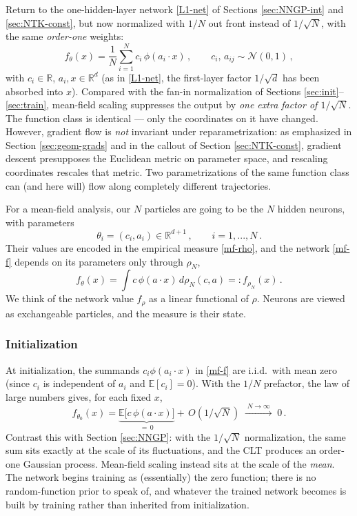 \documentclass[11pt]{article}
\newcommand{\R}{\mathbb{R}}
\newcommand{\E}{\mathbb{E}}
\newcommand{\CN}{{\mathcal N}}
\begin{document}
Return to the one-hidden-layer network \eqref{L1-net} of Sections \ref{sec:NNGP-int} and \ref{sec:NTK-const}, but now normalized with $1/N$ out front instead of $1/\sqrt N$, with the same \emph{order-one} weights:
%
\begin{equation} \label{mf-f}
    f_\theta(x) = \frac{1}{N} \sum_{i=1}^N c_i\,\phi(a_i\cdot x)\,,\qquad c_i,\, a_{ij} \sim \CN(0,1)\,,
\end{equation}
%
with $c_i\in\R$, $a_i,x\in\R^d$ (as in \eqref{L1-net}, the first-layer factor $1/\sqrt d$ has been absorbed into $x$). Compared with the fan-in normalization of Sections \ref{sec:init}--\ref{sec:train}, mean-field scaling suppresses the output by \emph{one extra factor of $1/\sqrt N$}. The function class is identical --- only the coordinates on it have changed. However, gradient flow is \emph{not} invariant under reparametrization: as emphasized in Section \ref{sec:geom-grads} and in the callout of Section \ref{sec:NTK-const}, gradient descent presupposes the Euclidean metric on parameter space, and rescaling coordinates rescales that metric. Two parametrizations of the same function class can (and here will) flow along completely different trajectories.

For a mean-field analysis, our $N$ particles are going to be the $N$ hidden neurons, with parameters
%
\begin{equation}
    \theta_i = (c_i,a_i) \in \R^{d+1}\,,\qquad i=1,...,N\,.
\end{equation}
%
Their values are encoded in the empirical measure \eqref{mf-rho}, and the network \eqref{mf-f} depends on its parameters only through $\rho_N$,
%
\begin{equation} \label{mf-frho}
    f_\theta(x) = \int c\,\phi(a\cdot x)\,d\rho_N(c,a) =: f_{\rho_N}(x)\,.
\end{equation}
%
We think of the network value $f_\rho$ as a linear functional of $\rho$. Neurons are viewed as exchangeable particles, and the measure is their state.

\subsubsection{Initialization}

At initialization, the summands $c_i\phi(a_i\cdot x)$ in \eqref{mf-f} are i.i.d.\ with mean zero (since $c_i$ is independent of $a_i$ and $\E[c_i]=0$). With the $1/N$ prefactor, the law of large numbers gives, for each fixed $x$,
%
\begin{equation}
    f_{\theta_0}(x) = \underbrace{\E\big[c\,\phi(a\cdot x)\big]}_{=\,0} + \,O(1/\sqrt N) \;\xrightarrow{\;N\to\infty\;}\; 0\,.
\end{equation}
%
Contrast this with Section \ref{sec:NNGP}: with the $1/\sqrt N$ normalization, the same sum sits exactly at the scale of its fluctuations, and the CLT produces an order-one Gaussian process. Mean-field scaling instead sits at the scale of the \emph{mean}.
The network begins training as (essentially) the zero function; there is no random-function prior to speak of, and whatever the trained network becomes is built by training rather than inherited from initialization.
\end{document}
